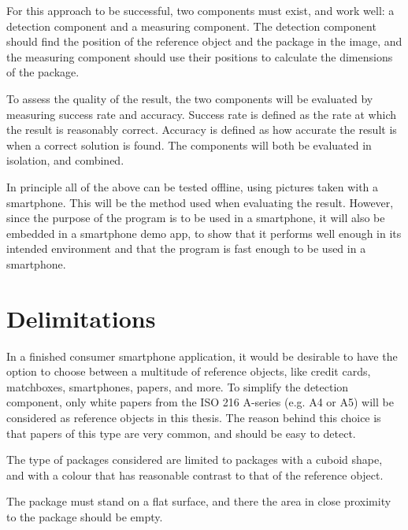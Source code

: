 For this approach to be successful, two components must exist, and work well: a detection component and a measuring component.
The detection component should find the position of the reference object and the package in the image, and the measuring component should use their positions to calculate the dimensions of the package.


To assess the quality of the result, the two components will be evaluated by measuring success rate and accuracy.
Success rate is defined as the rate at which the result is reasonably correct.
Accuracy is defined as how accurate the result is when a correct solution is found.
The components will both be evaluated in isolation, and combined.

In principle all of the above can be tested offline, using pictures taken with a smartphone.
This will be the method used when evaluating the result.
However, since the purpose of the program is to be used in a smartphone, it will also be embedded in a smartphone demo app, to show that it performs well enough in its intended environment and that the program is fast enough to be used in a smartphone.

\section{Delimitations}
In a finished consumer smartphone application, it would be desirable to have the option to choose between a multitude of reference objects, like credit cards, matchboxes, smartphones, papers, and more. 
To simplify the detection component, only white papers from the ISO 216 A-series (e.g. A4 or A5) will be considered as reference objects in this thesis.
The reason behind this choice is that papers of this type are very common, and should be easy to detect.

The type of packages considered are limited to packages with a cuboid shape, and with a colour that has reasonable contrast to that of the reference object.

The package must stand on a flat surface, and there the area in close proximity to the package should be empty.



